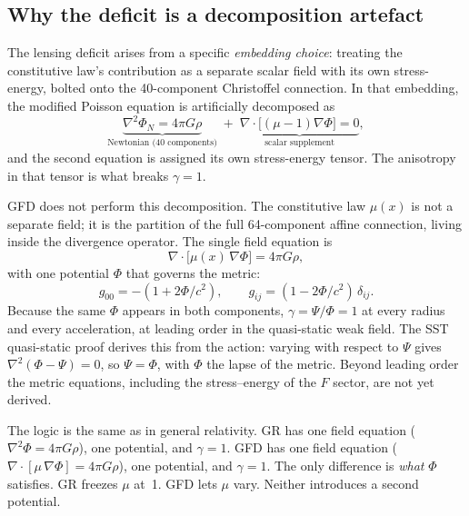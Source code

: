 \documentclass[11pt]{article}
\begin{document}
\subsection*{Why the deficit is a decomposition artefact}

The lensing deficit arises from a specific
\textit{embedding choice}: treating the constitutive
law's contribution as a separate scalar field with its
own stress-energy, bolted onto the 40-component
Christoffel connection.  In that embedding, the modified
Poisson equation is artificially decomposed as
\begin{equation}
  \underbrace{\nabla^2\Phi_N = 4\pi G\rho}_{\text{Newtonian (40 components)}}
  \;+\;
  \underbrace{\nabla\!\cdot\bigl[(\mu{-}1)\nabla\Phi\bigr]
  = 0}_{\text{scalar supplement}},
  \label{eq:decomposition}
\end{equation}
and the second equation is assigned its own
stress-energy tensor.  The anisotropy in that tensor is
what breaks $\gamma = 1$.

GFD does not perform this decomposition.  The
constitutive law $\mu(x)$ is not a separate field; it is
the partition of the full 64-component affine connection,
living inside the divergence operator.  The single
field equation is
\begin{equation}
  \nabla\!\cdot\bigl[\mu(x)\,\nabla\Phi\bigr]
  = 4\pi G\rho,
  \label{eq:gfd_poisson}
\end{equation}
with one potential $\Phi$ that governs the metric:
\begin{equation}
  g_{00} = -(1 + 2\Phi/c^2), \qquad
  g_{ij} = (1 - 2\Phi/c^2)\,\delta_{ij}.
  \label{eq:metric}
\end{equation}
Because the same $\Phi$ appears in both components,
$\gamma = \Psi/\Phi = 1$ at every radius and every
acceleration, at leading order in the quasi-static weak
field. The SST quasi-static proof derives this from the
action: varying with respect to $\Psi$ gives
$\nabla^2(\Phi - \Psi) = 0$, so $\Psi = \Phi$, with $\Phi$
the lapse of the metric. Beyond leading order the metric
equations, including the stress--energy of the $F$ sector,
are not yet derived.

The logic is the same as in general relativity.  GR
has one field equation ($\nabla^2\Phi = 4\pi G\rho$),
one potential, and $\gamma = 1$.  GFD has one field
equation ($\nabla\!\cdot[\mu\,\nabla\Phi] = 4\pi G\rho$),
one potential, and $\gamma = 1$.  The only difference is
\textit{what} $\Phi$ satisfies.  GR freezes $\mu$ at~1.
GFD lets $\mu$ vary.  Neither introduces a second
potential.
\end{document}
